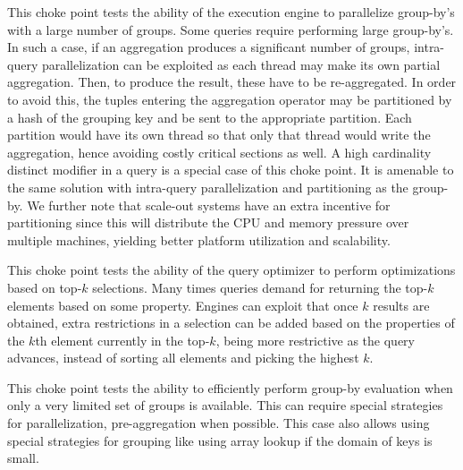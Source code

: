 



This choke point tests the ability of the execution engine to parallelize group-by's with a large number of groups. Some queries require performing large group-by's.
In such a case, if an aggregation produces a significant number of groups, intra-query parallelization can be exploited as each thread may make its own partial aggregation.
Then, to produce the result, these have to be re-aggregated. In order to avoid this, the tuples entering the aggregation operator may be partitioned by a hash of the grouping key and be sent to the appropriate partition.
Each partition would have its own thread so that only that thread would write the aggregation, hence avoiding costly critical sections as well. A high cardinality distinct modifier in a query is a special case of this choke point.
It is amenable to the same solution with intra-query parallelization and partitioning as the group-by.
We further note that scale-out systems have an extra incentive for partitioning since this will distribute the CPU and memory pressure over multiple machines, yielding better platform utilization and scalability.





This choke point tests the ability of the query optimizer to perform optimizations based on top-$k$ selections. Many times queries demand for returning the top-$k$ elements based on some property.
Engines can exploit that once $k$ results are obtained, extra restrictions in a selection can be added based on the properties of the $k$th element currently in the top-$k$, being more restrictive as the query advances, instead of sorting all elements and picking the highest $k$.





This choke point tests the ability to efficiently perform group-by evaluation
when only a very limited set of groups is available.  This can require special
strategies for parallelization, \eg pre-aggregation when possible. This case also allows using special strategies for grouping like using array lookup if the domain of keys is small.

